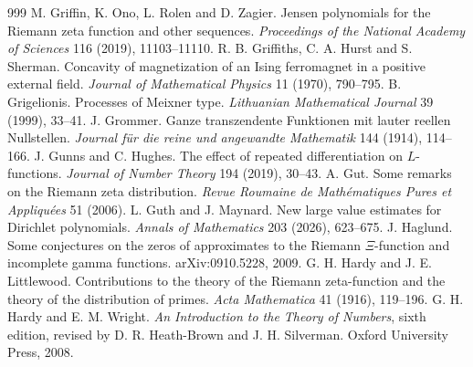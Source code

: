 \begin{thebibliography}{999}
 M. Griffin, K. Ono, L. Rolen and D. Zagier. Jensen polynomials for the Riemann zeta function and other sequences. \emph{Proceedings of the National Academy of Sciences} 116 (2019), 11103--11110.
 R. B. Griffiths, C. A. Hurst and S. Sherman. Concavity of magnetization of an Ising ferromagnet in a positive external field. \emph{Journal of Mathematical Physics} 11 (1970), 790--795.
 B. Grigelionis. Processes of Meixner type. \emph{Lithuanian Mathematical Journal} 39 (1999), 33--41.
 J. Grommer. Ganze transzendente Funktionen mit lauter reellen Nullstellen. \emph{Journal f\"ur die reine und angewandte Mathematik} 144 (1914), 114--166.
 J. Gunns and C. Hughes. The effect of repeated differentiation on $L$-functions. \emph{Journal of Number Theory} 194 (2019), 30--43.
 A. Gut. Some remarks on the Riemann zeta distribution. \emph{Revue Roumaine de Math\'ematiques Pures et Appliqu\'ees} 51 (2006).
 L. Guth and J. Maynard. New large value estimates for Dirichlet polynomials. \emph{Annals of Mathematics} 203 (2026), 623--675.
 J. Haglund. Some conjectures on the zeros of approximates to the Riemann $\Xi$-function and incomplete gamma functions. arXiv:0910.5228, 2009.
 G. H. Hardy and J. E. Littlewood. Contributions to the theory of the Riemann zeta-function and the theory of the distribution of primes. \emph{Acta Mathematica} 41 (1916), 119--196.
 G. H. Hardy and E. M. Wright. \emph{An Introduction to the Theory of Numbers}, sixth edition, revised by D. R. Heath-Brown and J. H. Silverman. Oxford University Press, 2008.

\end{thebibliography}

